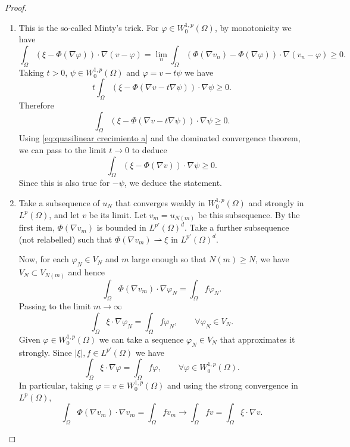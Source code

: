 \begin{proof}
\begin{enumerate}
        \item This is the so-called Minty's trick. For $\varphi \in W_0^{1,p}(\Omega)$, by monotonicity we have
              $$
                  \int_\Omega (\xi - \Phi(\nabla \varphi)) \cdot \nabla (v - \varphi) = \lim_n \int_\Omega (\Phi(\nabla v_n) - \Phi(\nabla \varphi)) \cdot \nabla (v_n - \varphi) \ge 0.
              $$
              Taking $t > 0$, $\psi \in W_0^{1,p}(\Omega)$ and $\varphi = v - t \psi$ we have
              $$
                  t \int_\Omega (\xi - \Phi(\nabla v - t \nabla \psi)) \cdot \nabla \psi  \ge 0.
              $$
              Therefore
              $$
                  \int_\Omega (\xi - \Phi(\nabla v - t \nabla \psi)) \cdot \nabla \psi  \ge 0.
              $$
              Using \eqref{eq:quasilinear crecimiento a} and the dominated convergence theorem, we can pass to the limit $t \to 0$ to deduce
              $$
                  \int_\Omega (\xi - \Phi(\nabla v )) \cdot \nabla \psi  \ge 0.
              $$
              Since this is also true for $-\psi$, we deduce the statement.

        \item Take a subsequence of $u_N$ that converges weakly in $W^{1,p}_0(\Omega)$ and strongly in $L^p(\Omega)$, and let $v$ be its limit. Let $v_m = u_{N(m)}$ be this subsequence. By the first item, $\Phi(\nabla v_m)$ is bounded in $L^{p'} (\Omega)^d$. Take a further subsequence (not relabelled) such that $\Phi(\nabla v_{m}) \rightharpoonup \xi$ in $L^{p'}(\Omega)^d$.

              Now, for each $\varphi_N \in V_N$ and $m$ large enough so that $N(m) \ge N$, we have $V_N \subset V_{N(m)}$ and hence
              $$
                  \int_\Omega \Phi(\nabla v_{m}) \cdot \nabla \varphi_N = \int_\Omega f \varphi_N.
              $$
              Passing to the limit $m \to \infty$
              $$
                  \int_\Omega \xi \cdot \nabla \varphi_N = \int_\Omega f \varphi_N , \qquad \forall \varphi_N \in V_N.
              $$
              Given $\varphi  \in W_0^{1,p}(\Omega)$ we can take a sequence $\varphi_N \in V_N$ that approximates it strongly. Since $|\xi|, f \in L^{p'} (\Omega)$ we have
              $$
                  \int_\Omega \xi \cdot \nabla \varphi  = \int_\Omega f \varphi, \qquad \forall \varphi \in W_0^{1,p}( \Omega).
              $$
              In particular, taking $\varphi = v \in W_0^{1,p} (\Omega)$ and using the strong convergence in $L^p(\Omega)$,
              $$
                  \int_\Omega \Phi(\nabla v_{m}) \cdot \nabla v_{m} = \int_\Omega f v_{m} \to \int_\Omega f v = \int_\Omega \xi \cdot \nabla v.
              $$


\end{enumerate}
\end{proof}

